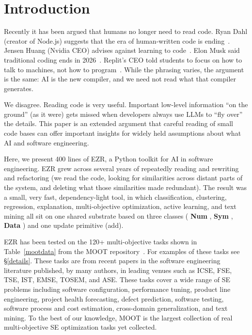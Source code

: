 \documentclass[AMA,STIX2COL]{WileyNJDv5}
\newcommand{\IT}{{\sffamily EZR}}
\newcommand{\cls}[1]{%
  \setlength{\fboxsep}{1.5pt}%
  \colorbox{clsbg}{\sffamily\bfseries{#1}}%
}
\begin{document}
{

\maketitle
\section{Introduction}
\label{sec:intro}

Recently it has been argued that humans no longer need to read
code. Ryan Dahl (creator of Node.js) suggests that the era of
human-written code is ending~\cite{dahl2024}. Jensen Huang
(Nvidia CEO) advises against learning to code~\cite{huang2024}.
Elon Musk said traditional coding ends in 2026~\cite{musk2026}.
Replit's CEO told students to focus on how to talk to machines,
not how to program~\cite{masad2025}. While the phrasing varies,
the argument is the same: AI is the new compiler, and we need not
read what that compiler generates.

We disagree. Reading code is very useful. Important low-level
information ``on the ground'' (as it were) gets missed when
developers always use LLMs to ``fly over'' the details. This
paper is an extended argument that careful reading of small code
bases can offer important insights
for   widely held assumptions about
what AI and software engineering.

Here, we present 400 lines of \IT{}, a Python toolkit for
AI in software engineering. \IT{} grew across several years of
repeatedly reading and rewriting and refactoring (we read the
code, looking for similarities across distant parts of the
system, and deleting what those similarities made redundant).
The result was a small, very fast, dependency-light tool, in
which classification, clustering,  regression, explanation, multi-objective
optimization,
active learning, and text mining all sit on one shared substrate
based on three classes (\cls{Num}, \cls{Sym}, \cls{Data}) and one
update primitive (\textsf{add}).

\IT{} has been tested on the 120+ multi-objective tasks shown in
Table~\ref{mootdata} from the MOOT
repository~\cite{menzies2025moot}. For examples of these tasks
see \S\ref{details}. These
tasks are from recent papers in the software engineering
literature published, by many authors, in leading venues such as
ICSE, FSE, TSE, IST, EMSE, TOSEM, and ASE. These tasks cover a
wide range of SE problems including software configuration,
performance tuning, product line engineering, project health
forecasting, defect prediction, software testing, software
process and cost estimation, cross-domain generalization, and
text mining. To the best of our knowledge, MOOT is the largest
collection of real multi-objective SE optimization tasks yet
collected.


}
\end{document}
